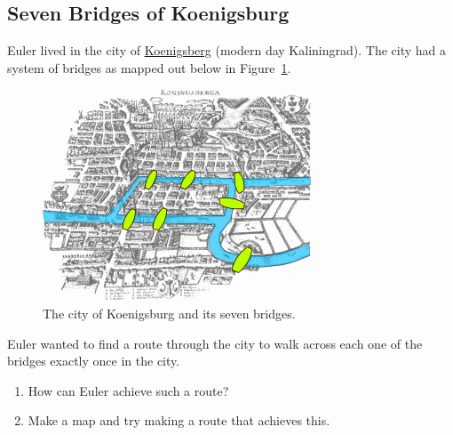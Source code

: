 \documentclass[]{article}
\numberwithin{equation}{section}
\theoremstyle{definition}
\theoremstyle{remark}
\begin{document}
	\newpage
\subsection{Seven Bridges of Koenigsburg }
Euler lived in the city of \href{https://goo.gl/maps/h28p2rEpXZGGkn9M6}{Koenigsberg} (modern day Kaliningrad). The city had a system of bridges as mapped out below in Figure~\ref{F:seven-bridges}. 
\begin{figure}[htbp!]
	\begin{center}
		\includegraphics[scale=0.5]{konigsberg_bridges.png}
	\end{center}
	\caption{The city of Koenigsburg and its seven bridges.}\label{F:seven-bridges}
\end{figure}
Euler wanted to find a route through the city to walk across each one of the bridges exactly once in the city. 
\begin{enumerate}
\item How can Euler achieve such a route? 
\item Make a map and try making a route that achieves this. 
\end{enumerate}


	
\end{document}

